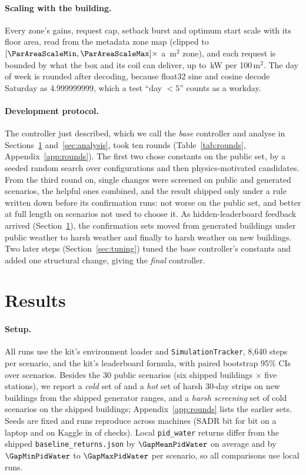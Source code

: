 \paragraph{Scaling with the building.} Every zone's gains, request cap, setback burst and optimum start scale with its floor area, read from the metadata zone map (clipped to $[\ParAreaScaleMin, \ParAreaScaleMax]\times$ a \ParAreaRef\,m$^2$ zone), and each request is bounded by what the box and its coil can deliver, up to \RFiveParQcapKw\,kW per 100\,m$^2$. The day of week is rounded after decoding, because float32 sine and cosine decode Saturday as 4.999999999, which a test ``day $<5$'' counts as a workday.

\paragraph{Development protocol.} The controller just described, which we call the \emph{base} controller and analyse in Sections~\ref{sec:results} and~\ref{sec:analysis}, took ten rounds (Table~\ref{tab:rounds}, Appendix~\ref{app:rounds}). The first two chose constants on the public set, by a seeded random search over \NTuneConfigs{} configurations and then \NCandV{} physics-motivated candidates. From the third round on, single changes were screened on public and generated scenarios, the helpful ones combined, and the result shipped only under a rule written down before its confirmation runs: not worse on the public set, and better at full length on scenarios not used to choose it. As hidden-leaderboard feedback arrived (Section~\ref{sec:results}), the confirmation sets moved from generated buildings under public weather to harsh weather and finally to harsh weather on new buildings. Two later steps (Section~\ref{sec:tuning}) tuned the base controller's constants and added one structural change, giving the \emph{final} controller.

\section{Results}
\label{sec:results}

\paragraph{Setup.} All runs use the kit's environment loader and \texttt{SimulationTracker}, 8,640 steps per scenario, and the kit's leaderboard formula, with paired bootstrap 95\% CIs over scenarios. Besides the 30 public scenarios (six shipped buildings $\times$ five stations), we report a \emph{cold} set of \RTenConfHarshCThreeN{} and a \emph{hot} set of \RTenConfHotHN{} harsh 30-day strips on \RTenNNewBuild{} new buildings from the shipped generator ranges, and a \emph{harsh screening} set of \RSixHarshSN{} cold scenarios on the shipped buildings; Appendix~\ref{app:rounds} lists the earlier sets. Seeds are fixed and runs reproduce across machines (SADR bit for bit on a laptop and on Kaggle in \RSixReproIdentical{} of \RSixReproN{} checks). Local \texttt{pid\_water} returns differ from the shipped \texttt{baseline\_returns.json} by $\GapMeanPidWater$ on average and by $\GapMinPidWater$ to $\GapMaxPidWater$ per scenario, so all comparisons use local runs.

